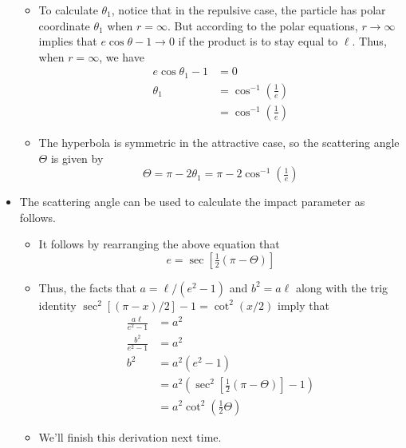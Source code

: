 \documentclass[../notes.tex]{subfiles}
\begin{document}
\begin{itemize}
\begin{itemize}
        \item To calculate $\theta_1$, notice that in the repulsive case, the particle has polar coordinate $\theta_1$ when $r=\infty$. But according to the polar equations, $r\to\infty$ implies that $e\cos\theta-1\to 0$ if the product is to stay equal to $\ell$. Thus, when $r=\infty$, we have
        \begin{align*}
            e\cos\theta_1-1 &= 0\\
            \theta_1 &= \cos^{-1}\left( \tfrac{1}{e} \right)\\
            &= \cos^{-1}\left( \tfrac{1}{e} \right)
        \end{align*}
        \item The hyperbola is symmetric in the attractive case, so the scattering angle $\Theta$ is given by
        \begin{equation*}
            \Theta = \pi-2\theta_1 = \pi-2\cos^{-1}\left( \tfrac{1}{e} \right)
        \end{equation*}
    \end{itemize}
    \item The scattering angle can be used to calculate the impact parameter as follows.
    \begin{itemize}
        \item It follows by rearranging the above equation that
        \begin{equation*}
            e = \sec\left[ \tfrac{1}{2}(\pi-\Theta) \right]
        \end{equation*}
        \item Thus, the facts that $a=\ell/(e^2-1)$ and $b^2=a\ell$ along with the trig identity $\sec^2[(\pi-x)/2]-1=\cot^2(x/2)$ imply that
        \begin{align*}
            \frac{a\ell}{e^2-1} &= a^2\\
            \frac{b^2}{e^2-1} &= a^2\\
            b^2 &= a^2(e^2-1)\\
            &= a^2(\sec^2\left[ \tfrac{1}{2}(\pi-\Theta) \right]-1)\\
            &= a^2\cot^2\left( \tfrac{1}{2}\Theta \right)
        \end{align*}
        \item We'll finish this derivation next time.
    \end{itemize}
\end{itemize}
\end{document}
